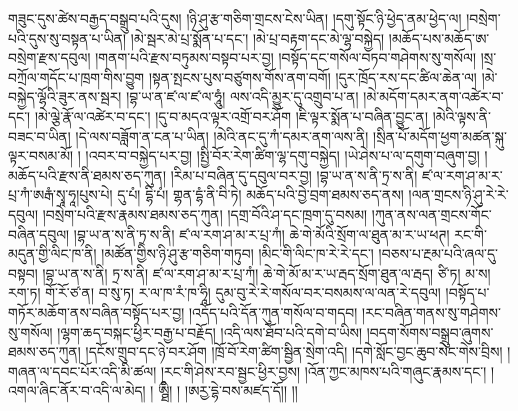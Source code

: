 གཟུང་དུས་ཚེས་བརྒྱད་བསྒྲུབ་པའི་དུས། །ཉི་ཤུ་རྩ་གཅིག་གྲངས་ངེས་ཡིན། །དགུ་སྟོང་ཉི་ཕྱེད་ནམ་ཕྱེད་ལ། །བསྲེག་པའི་དུས་སུ་བསྟན་པ་ཡིན། །མེ་སྦར་མེ་པྲ་སྨོན་པ་དང་། །མེ་པྲ་བརྟག་དང་མེ་ལྷ་བསྐྱེད། །མཆོད་པས་མཆོད་ཨ་བསྲེག་རྫས་དབུལ། །གནག་པའི་རྫས་བཏུམས་བསྟབ་པར་བྱ། །བསྟོད་དང་གསོལ་བཏབ་གཤེགས་སུ་གསོལ། །སྲ་བཀྲོལ་གདོང་པ་ཁྲག་གིས་བྱུག །སྟན་སྤངས་པུས་བཙུགས་གོས་ནག་བགོ། །དུར་ཁྲོད་རས་དང་ཚིལ་ཆེན་ལ། །མེ་བསྐྱེད་ལྷོའི་ཟུར་ནས་སྦར། །བྷ་ཡ་ན་ཛ་ལ་ཛ་ལ་ཧཱུཾ། ལས་འདི་མྱུར་དུ་འགྲུབ་པ་ན། །མེ་མདོག་དམར་ནག་འཚེར་བ་དང་། །མེ་ལྕེ་རྣོ་ལ་འཚེར་བ་དང་། །དུ་བ་མདའ་ལྟར་འགྲོ་བར་ཤོག །ཇི་ལྟར་སྨོན་པ་བཞིན་བྱུང་ན། །མེའི་ལྟས་ནི་བཟང་བ་ཡིན། །དེ་ལས་བཟློག་ན་ངན་པ་ཡིན། །མེའི་ནང་དུ་ཀཾ་དམར་ནག་ལས་ནི། །སྲིན་པོ་མདོག་ཕྱག་མཚན་སྐུ་ལྟར་བསམ་མོ། ། །འབར་བ་བསྐྱེད་པར་བྱ། །སྤྱི་བོར་རེག་ཚིག་ལྷ་དགུ་བསྐྱེད། །ཡེ་ཤེས་པ་ལ་དགུག་བཞུག་བྱ། །མཆོད་པའི་རྫས་ནི་ཐམས་ཅད་ཀུན། །རིམ་པ་བཞིན་དུ་དབུལ་བར་བྱ། །བྷ་ཡ་ན་ས་ནི་ཏྲ་ས་ནི། ཛ་ལ་རག་ཤ་མ་ར་པྲ་ཀཾ་ཨརྒཾ་སྭཱ་ཧཱ།པུས་པེ། དུ་པཾ། དྷི་པཾ། གྷན་དྷཾ་ནི་བི་ཏེ། མཆོད་པའི་བྱེ་བྲག་ཐམས་ཅད་ནས། །ལན་གྲངས་ཉི་ཤུ་རེ་རེ་དབུལ། །བསྲེག་པའི་རྫས་རྣམས་ཐམས་ཅད་ཀུན། །དགྲ་བོའི་ཤ་དང་ཁྲག་དུ་བསམ། །ཀུན་ནས་ལན་གྲངས་གོང་བཞིན་དབུལ། །བྷ་ཡ་ན་ས་ནི་ཏྲ་ས་ནི། ཛ་ལ་རག་ཤ་མ་ར་པྲ་ཀཾ། ཆེ་གེ་མོའི་སྲོག་ལ་ཐུན་མ་ར་ཡ་ཕཊ། རང་གི་མདུན་གྱི་ལིང་ཁ་ནི། །མཚོན་གྱིས་ཉི་ཤུ་རྩ་གཅིག་གཏུབ། །མིང་གི་ལིང་ཁ་རེ་རེ་དང་། །བཅས་པ་རྔམ་པའི་ཞལ་དུ་བསྟབ། །བྷ་ཡ་ན་ས་ནི། ཏྲ་ས་ནི། ཛ་ལ་རག་ཤ་མ་ར་པྲ་ཀཾ། ཆེ་གེ་མོ་མ་ར་ཡ་རྦད་སྲོག་ཐུན་ལ་རྦད། ཙི་ཏ། མ་ས། རག་ཏ། གོ་རོ་ཙ་ན། བ་སུ་ཏ། ར་ལ་ཁ་རཾ་ཁ་ཧཱི། དུམ་བུ་རེ་རེ་གསོལ་བར་བསམས་ལ་ལན་རེ་དབུལ། །བསྟོད་པ་གཏོར་མཆོག་ནས་བཞིན་བསྟོད་པར་བྱ། །འདོད་པའི་དོན་ཀུན་གསོལ་བ་གདབ། །རང་བཞིན་གནས་སུ་གཤེགས་སུ་གསོལ། །ལྷག་ཆད་བསྐང་ཕྱིར་བརྒྱ་པ་བརྗོད། །འདི་ལས་ཐོབ་པའི་དགེ་བ་ཡིས། །བདག་སོགས་བསྒྲུབ་ཞུགས་ཐམས་ཅད་ཀུན། །དངོས་གྲུབ་དང་ཉེ་བར་ཤོག །ཁྲོ་བོ་རེག་ཚིག་སྦྱིན་སྲེག་འདི། །དགེ་སློང་བྱང་ཆུབ་སེང་གེས་བྲིས། །གཞན་ལ་དབང་པོར་འདི་མི་ཚལ། །རང་གི་ཤེས་རབ་སྦྱང་ཕྱིར་བྱས། །འོན་ཀྱང་མཁས་པའི་གཞུང་རྣམས་དང་། །འགལ་ཞིང་ནོར་བ་འདི་ལ་མེད། ། ཨྠྀི། ། །ཨརྱ་དྷེ་བས་མཛད་དོ།། །།